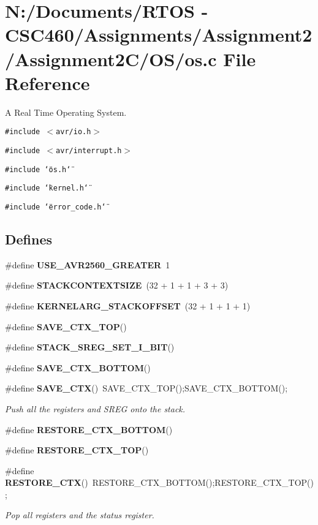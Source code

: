 \section{N:/Documents/RTOS - CSC460/Assignments/Assignment2/Assignment2C/OS/os.c File Reference}
\label{os_8c}
A Real Time Operating System. 

{\tt \#include $<$avr/io.h$>$}\par
{\tt \#include $<$avr/interrupt.h$>$}\par
{\tt \#include \char`\"{}os.h\char`\"{}}\par
{\tt \#include \char`\"{}kernel.h\char`\"{}}\par
{\tt \#include \char`\"{}error\_\-code.h\char`\"{}}\par
\subsection*{Defines}
\begin{CompactItemize}
\item 
\#define {\bf USE\_\-AVR2560\_\-GREATER}~1
\item 
\#define {\bf STACKCONTEXTSIZE}~(32 + 1 + 1 + 3 + 3)
\item 
\#define {\bf KERNELARG\_\-STACKOFFSET}~(32 + 1 + 1 + 1)
\item 
\#define {\bf SAVE\_\-CTX\_\-TOP}()
\item 
\#define {\bf STACK\_\-SREG\_\-SET\_\-I\_\-BIT}()
\item 
\#define {\bf SAVE\_\-CTX\_\-BOTTOM}()
\item 
\#define {\bf SAVE\_\-CTX}()~SAVE\_\-CTX\_\-TOP();SAVE\_\-CTX\_\-BOTTOM();
\begin{CompactList}\small\item\em Push all the registers and SREG onto the stack. \item\end{CompactList}\item 
\#define {\bf RESTORE\_\-CTX\_\-BOTTOM}()
\item 
\#define {\bf RESTORE\_\-CTX\_\-TOP}()
\item 
\#define {\bf RESTORE\_\-CTX}()~RESTORE\_\-CTX\_\-BOTTOM();RESTORE\_\-CTX\_\-TOP();
\begin{CompactList}\small\item\em Pop all registers and the status register. \item\end{CompactList}\end{CompactItemize}
